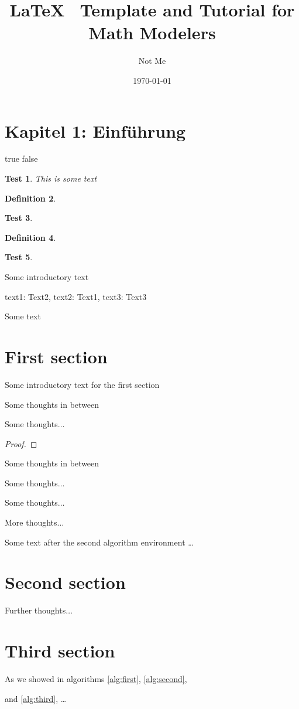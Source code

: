 \documentclass[12pt]{article}   %
\title{LaTeX \, Template and Tutorial for Math Modelers}
\author{Not Me}
\date{\today}
\newenvironment{testing}[3][dummy]{
	text1: #1, text2: #2, text3: #3
	\newline
} {
}
\newtheorem{test1}{Test}[counter]
\newtheorem{test2}[test1]{Definition}
\begin{document}
\section{Kapitel 1: Einführung}

\if true false
\begin{test1} This is some text
\end{test1}
\begin{test2}
\end{test2}
\begin{test1}
\end{test1}
\begin{test2}
\end{test2}
\begin{test1}
\end{test1}

Some introductory text

\begin{testing}[Text2]{Text1}{Text3}
Some text
\end{testing}
\fi

\section{First section}
Some introductory text for the first section

Some thoughts in between

\begin{theorem}[Text]
Some thoughts$\ldots$ \label{alg:first}
\end{theorem}

\begin{proof}
\end{proof}

Some thoughts in between

\begin{lemma}
Some thoughts$\ldots$ \label{alg:first}
\end{lemma}

\begin{definition}
Some thoughts$\ldots$ \label{alg:first}
\end{definition}

\begin{theorem}
More thoughts$\ldots$ \label{alg:second}
\end{theorem}

Some text after the second algorithm environment \ldots

\section{Second section}

\begin{theorem}
Further thoughts$\ldots$ \label{alg:third}
\end{theorem}

\section{Third section}

As we showed in algorithms \ref{alg:first}, \ref{alg:second}, 

and \ref{alg:third}, \ldots 
\end{document}
